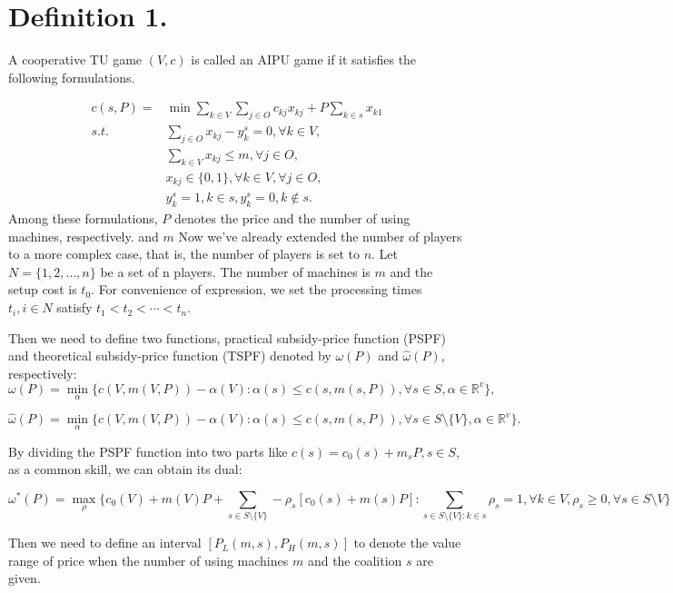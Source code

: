 \documentclass[UTF8]{article}
\begin{document}
\section*{Definition 1.}

A cooperative TU game $(V,c)$ is called an AIPU game if it satisfies the following formulations.

\[
\begin{aligned}
c(s,P) = & {\min} \sum_{k\in V}\sum_{j\in O} {c_{kj} x_{kj}} + {P\sum_{k\in s} x_{k1}} \\
{s.t.}\quad & \sum_{j \in O} x_{kj}-y_k^s=0, \forall k \in V, \\
& \sum_{k\in V} x_{kj} \leq m,\forall j \in O,  \\
& x_{kj} \in \{0,1\} , \forall k \in V, \forall j \in O,\\
& y_k^s=1, k \in s, y_k^s=0, k \notin s.
\end{aligned}
\]
Among these formulations, $P$ denotes the price and the number of using machines, respectively. and $m$
Now we've already extended the number of players to a more complex case, that is, the number of players is set to $n$.
Let $N=\{1,2,\ldots,n\}$ be a set of n players. The number of machines is $m$ and the setup cost is $t_0$.
For convenience of expression, we set the processing times $t_i, i\in N$ satisfy $t_1<t_2<\cdots<t_n$.

Then we need to define two functions, practical subsidy-price function (PSPF) and theoretical subsidy-price function (TSPF) denoted by $\omega(P)$ and $\hat{\omega}(P)$, respectively:
\[
  {\omega(P)}=\mathop{\min}_{\alpha}\{c(V,m(V,P))-\alpha(V): \alpha(s)\leq c(s,m(s,P))
 ,\forall s \in S, \alpha\in\mathbb{R}^{v}\},
\]

\[
  {\hat{\omega}(P)}=\mathop{\min}_{\alpha}\{c(V,m(V,P))-\alpha(V): \alpha(s)\leq c(s,m(s,P))
 ,\forall s \in S\setminus\{V\}, \alpha\in\mathbb{R}^{v}\}.
\]

By dividing the PSPF function into two parts like $c(s)=c_0(s)+m_sP, s \in S$, as a common skill, we can obtain its dual:

\begin{equation}\label{dual}
 {\omega^*(P)}=\mathop{\max}_{\rho} \{c_0(V)+m(V)P+\sum_{s\in S\setminus\{V\}}-\rho_s[c_0(s)+m(s)P]:
 \sum_{s\in S\setminus\{V\}:k\in s}\rho_s=1,\forall k \in V,\rho_s\geq 0,\forall s \in S \setminus{V}\}
\end{equation}

Then we need to define an interval $[P_L(m,s),P_H(m,s)]$ to denote the value range of price when the number of using machines $m$ and the coalition $s$ are given.
\end{document}
